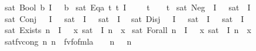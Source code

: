 \begin{isabellebody}
{\isacharbar}{\kern0pt}\ {\isachardoublequoteopen}sat\ {\isacharparenleft}{\kern0pt}Bool\ b{\isacharparenright}{\kern0pt}\ I\ {\isasymsigma}\ {\isasymlongleftrightarrow}\ b{\isachardoublequoteclose}\isanewline
{\isacharbar}{\kern0pt}\ {\isachardoublequoteopen}sat\ {\isacharparenleft}{\kern0pt}Eqa\ t\ t{\isacharprime}{\kern0pt}{\isacharparenright}{\kern0pt}\ I\ {\isasymsigma}\ {\isasymlongleftrightarrow}\ {\isasymsigma}\ {\isasymcdot}\ t\ {\isacharequal}{\kern0pt}\ {\isasymsigma}\ {\isasymcdot}\ t{\isacharprime}{\kern0pt}{\isachardoublequoteclose}\isanewline
{\isacharbar}{\kern0pt}\ {\isachardoublequoteopen}sat\ {\isacharparenleft}{\kern0pt}Neg\ {\isasymphi}{\isacharparenright}{\kern0pt}\ I\ {\isasymsigma}\ {\isasymlongleftrightarrow}\ {\isasymnot}sat\ {\isasymphi}\ I\ {\isasymsigma}{\isachardoublequoteclose}\isanewline
{\isacharbar}{\kern0pt}\ {\isachardoublequoteopen}sat\ {\isacharparenleft}{\kern0pt}Conj\ {\isasymphi}\ {\isasympsi}{\isacharparenright}{\kern0pt}\ I\ {\isasymsigma}\ {\isasymlongleftrightarrow}\ sat\ {\isasymphi}\ I\ {\isasymsigma}\ {\isasymand}\ sat\ {\isasympsi}\ I\ {\isasymsigma}{\isachardoublequoteclose}\isanewline
{\isacharbar}{\kern0pt}\ {\isachardoublequoteopen}sat\ {\isacharparenleft}{\kern0pt}Disj\ {\isasymphi}\ {\isasympsi}{\isacharparenright}{\kern0pt}\ I\ {\isasymsigma}\ {\isasymlongleftrightarrow}\ sat\ {\isasymphi}\ I\ {\isasymsigma}\ {\isasymor}\ sat\ {\isasympsi}\ I\ {\isasymsigma}{\isachardoublequoteclose}\isanewline
{\isacharbar}{\kern0pt}\ {\isachardoublequoteopen}sat\ {\isacharparenleft}{\kern0pt}Exists\ n\ {\isasymphi}{\isacharparenright}{\kern0pt}\ I\ {\isasymsigma}\ {\isasymlongleftrightarrow}\ {\isacharparenleft}{\kern0pt}{\isasymexists}x{\isachardot}{\kern0pt}\ sat\ {\isasymphi}\ I\ {\isacharparenleft}{\kern0pt}{\isasymsigma}{\isacharparenleft}{\kern0pt}n\ {\isacharcolon}{\kern0pt}{\isacharequal}{\kern0pt}\ x{\isacharparenright}{\kern0pt}{\isacharparenright}{\kern0pt}{\isacharparenright}{\kern0pt}{\isachardoublequoteclose}\isanewline
{\isacharbar}{\kern0pt}\ {\isachardoublequoteopen}sat\ {\isacharparenleft}{\kern0pt}Forall\ n\ {\isasymphi}{\isacharparenright}{\kern0pt}\ I\ {\isasymsigma}\ {\isasymlongleftrightarrow}\ {\isacharparenleft}{\kern0pt}{\isasymforall}x{\isachardot}{\kern0pt}\ sat\ {\isasymphi}\ I\ {\isacharparenleft}{\kern0pt}{\isasymsigma}{\isacharparenleft}{\kern0pt}n\ {\isacharcolon}{\kern0pt}{\isacharequal}{\kern0pt}\ x{\isacharparenright}{\kern0pt}{\isacharparenright}{\kern0pt}{\isacharparenright}{\kern0pt}{\isachardoublequoteclose}\isanewline
\isanewline
{}\isamarkupfalse%
\ sat{\isacharunderscore}{\kern0pt}fv{\isacharunderscore}{\kern0pt}cong{\isacharcolon}{\kern0pt}\ {\isachardoublequoteopen}{\isacharparenleft}{\kern0pt}{\isasymAnd}n{\isachardot}{\kern0pt}\ n\ {\isasymin}\ fv{\isacharunderscore}{\kern0pt}fo{\isacharunderscore}{\kern0pt}fmla\ {\isasymphi}\ {\isasymLongrightarrow}\ {\isasymsigma}\ n\ {\isacharequal}{\kern0pt}\ {\isasymsigma}{\isacharprime}{\kern0pt}\ n{\isacharparenright}{\kern0pt}\ {\isasymLongrightarrow}\isanewline

\end{isabellebody}
